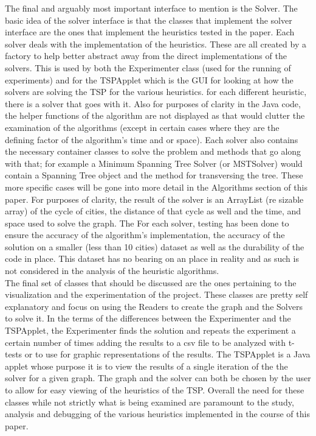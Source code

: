 \documentclass[midd]{thesis}
\newcommand{\tab}{\hspace*{2em}}
\begin{document}
\tab The final and arguably most important interface to mention is the Solver. The basic idea of the solver interface is that the classes that implement the solver interface are the ones that implement the heuristics tested in the paper. Each solver deals with the implementation of the heuristics. These are all created by a factory to help better abstract away from the direct implementations of the solvers. This is used by both the Experimenter class (used for the running of experiments) and for the TSPApplet which is the GUI for looking at how the solvers are solving the TSP for the various heuristics. for each different heuristic, there is a solver that goes with it. Also for purposes of clarity in the Java code, the helper functions of the algorithm are not displayed as that would clutter the examination of the algorithms (except in certain cases where they are the defining factor of the algorithm's time and or space). Each solver also contains the necessary container classes to solve the problem and methods that go along with that; for example a Minimum Spanning Tree Solver (or MSTSolver) would contain a Spanning Tree object and the method for transversing the tree. These more specific cases will be gone into more detail in the Algorithms section of this paper. For purposes of clarity, the result of the solver is an ArrayList (re sizable array) of the cycle of cities, the distance of that cycle as well and the time, and space used to solve the graph. The For each solver, testing has been done to ensure the accuracy of the algorithm's implementation, the accuracy of the solution on a smaller (less than 10 cities) dataset as well as the durability of the code in place. This dataset has no bearing on an place in reality and as such is not considered in the analysis of the heuristic algorithms.\\
\tab The final set of classes that should be discussed are the ones pertaining to the visualization and the experimentation of the project. These classes are pretty self explanatory and focus on using the Readers to create the graph and the Solvers to solve it. In the terms of the differences between the Experimenter and the TSPApplet, the Experimenter finds the solution and repeats the experiment a certain number of times adding the results to a csv file to be analyzed with t-tests or to use for graphic representations of the results. The TSPApplet is a Java applet whose purpose it is to view the results of a single iteration of the the solver for a given graph. The graph and the solver can both be chosen by the user to allow for easy viewing of the heuristics of the TSP. Overall the need for these classes while not strictly what is being examined are paramount to the study, analysis and debugging of the various heuristics implemented in the course of this paper.\\
\end{document}
